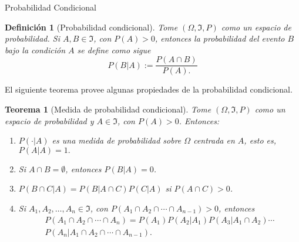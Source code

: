 \documentclass{beamer}
\newtheorem{defi}{Definición}[section]
\newtheorem{theo}{Teorema}[section]
\begin{document}
	\begin{frame}[allowframebreaks]{Probabilidad Condicional}
		\begin{defi}[Probabilidad condicional]
			Tome $(\Omega, \Im, P)$ como un espacio de probabilidad. Si $A,B\in\Im$, con $P(A)>0$, entonces la probabilidad del evento $B$ bajo la condición $A$ se define como sigue
			$$P(B|A):=\frac{P(A\cap B)}{P(A).}$$
		\end{defi}
		El siguiente teorema provee algunas propiedades de la probabilidad condicional.
		\begin{theo}[Medida de probabilidad condicional]
			Tome $(\Omega, \Im, P)$ como un espacio de probabilidad y $A\in\Im$, con $P(A)>0$. Entonces:
			\begin{enumerate}
				\item $P(\cdot | A)$ es una medida de probabilidad sobre $\Omega$ centrada en $A$, esto es, $P(A|A)=1.$
				\item Si $A\cap B=\emptyset$, entonces $P(B|A)=0$.
				\item $P(B\cap C |A)=P(B|A\cap C)P(C|A)$ si $P(A\cap C)>0$.
				\item Si $A_1,A_2,\dots,A_n\in\Im$, con $P(A_1\cap A_2\cap\cdots\cap A_{n-1})>0$, entonces
				\begin{align*}
				P(A_1\cap A_2\cap\cdots\cap A_n)=P(A_1)P(A_2|A_1)P(A_3|A_1\cap A_2)\cdots\\ P(A_n|A_1\cap A_2\cap \cdots\cap A_{n-1}).
				\end{align*}
			\end{enumerate}
		\end{theo}
		

\end{frame}
\end{document}
